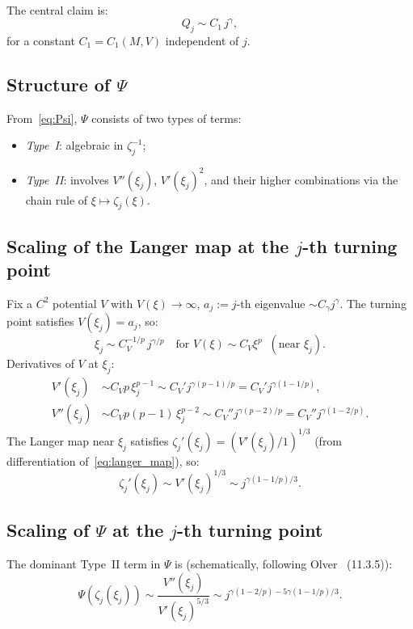 \documentclass[12pt,a4paper]{amsart}
\theoremstyle{definition}
\begin{document}
The central claim is:
\begin{equation}\label{eq:Qj_scaling}
  Q_j \sim C_1\,j^\gamma,
\end{equation}
for a constant $C_1 = C_1(M,V)$ independent of $j$.

\subsection{Structure of $\Psi$}
From~\eqref{eq:Psi}, $\Psi$ consists of two types of terms:
\begin{itemize}[nosep]
  \item \emph{Type~I}: algebraic in $\zeta_j^{-1}$;
  \item \emph{Type~II}: involves $V''(\xi_j)$, $V'(\xi_j)^2$,
    and their higher combinations via the chain rule of
    $\xi\mapsto\zeta_j(\xi)$.
\end{itemize}

\subsection{Scaling of the Langer map at the $j$-th turning point}
\label{ssec:langer_scaling}

Fix a $C^2$ potential $V$ with $V(\xi)\to\infty$,
$a_j := j$-th eigenvalue $\sim C_\gamma j^\gamma$.
The turning point satisfies $V(\xi_j) = a_j$, so:
\begin{equation}\label{eq:xij}
  \xi_j \sim C_V^{-1/p}\,j^{\gamma/p}
  \quad\text{for }V(\xi)\sim C_V\xi^p
  \;\;(\text{near }\xi_j).
\end{equation}
Derivatives of $V$ at $\xi_j$:
\begin{align}
  V'(\xi_j) &\sim C_V p\,\xi_j^{p-1}
    \sim C_V' j^{\gamma(p-1)/p}
    = C_V' j^{\gamma(1-1/p)}, \label{eq:Vprime}\\
  V''(\xi_j) &\sim C_V p(p-1)\,\xi_j^{p-2}
    \sim C_V'' j^{\gamma(p-2)/p}
    = C_V'' j^{\gamma(1-2/p)}. \label{eq:Vpprime}
\end{align}
The Langer map near $\xi_j$ satisfies
$\zeta_j'(\xi_j) = (V'(\xi_j)/1)^{1/3}$ (from differentiation
of~\eqref{eq:langer_map}), so:
\begin{equation}\label{eq:zeta_prime}
  \zeta_j'(\xi_j) \sim V'(\xi_j)^{1/3}
  \sim j^{\gamma(1-1/p)/3}.
\end{equation}

\subsection{Scaling of $\Psi$ at the $j$-th turning point}
The dominant Type~II term in $\Psi$ is (schematically,
following Olver~\cite{Olver1997} (11.3.5)):
\begin{equation}\label{eq:Psi_dominant}
  \Psi(\zeta_j(\xi_j))
  \sim \frac{V''(\xi_j)}{V'(\xi_j)^{5/3}}
  \sim j^{\gamma(1-2/p) - 5\gamma(1-1/p)/3}.
\end{equation}
\end{document}
